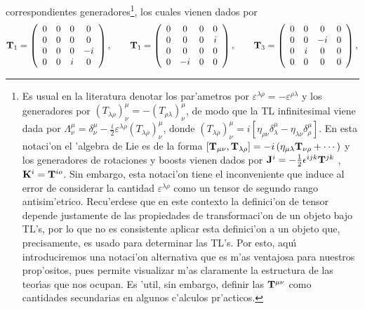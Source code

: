 correspondientes generadores\footnote{%
Es usual en la literatura denotar los par'ametros por $\varepsilon
^{\lambda \rho }=-\varepsilon ^{\rho \lambda }$ y los generadores por $%
\left( T_{\lambda \rho }\right) _{\nu }^{\mu }=-\left( T_{\rho \lambda
}\right) _{\nu }^{\mu }$, de modo que la TL infinitesimal viene dada por $%
\Lambda _{\nu }^{\mu }=\delta _{\nu }^{\mu }-\frac{i}{2}\varepsilon
^{\lambda \rho }\left( T_{\lambda \rho }\right) _{\nu }^{\mu }$, donde $%
\left( T_{\lambda \rho }\right) _{\nu }^{\mu }=i\left[ \eta _{\rho \nu
}\delta _{\lambda }^{\mu }-\eta _{\lambda \nu }\delta _{\rho }^{\mu }\right] 
$. En esta notaci'on el 'algebra de Lie es de la forma $\left[ {\bf T}%
_{\mu \nu },{\bf T}_{\lambda \rho }\right] =-i\left( \eta _{\mu \lambda }%
{\bf T}_{\nu \rho }+\cdots \right) $ y los generadores de rotaciones y
boosts vienen dados por ${\bf J}^{i}=-\frac{1}{2}\epsilon ^{ijk}{\bf T}^{jk}$%
, ${\bf K}^{i}={\bf T}^{io}$. Sin embargo, esta notaci'on tiene el
inconveniente que induce al error de considerar la cantidad $\varepsilon
^{\lambda \rho }$ como un tensor de segundo rango antisim'etrico.
Recu'erdese que en este contexto la definici'on de tensor depende
justamente de las propiedades de transformaci'on de un objeto bajo TL's,
por lo que no es consistente aplicar esta definici'on a un objeto que,
precisamente, es usado para determinar las TL's. Por esto, aqu{\'{\i }}
introduciremos una notaci'on alternativa que es m'as ventajosa para
nuestros prop'ositos, pues permite visualizar m'as claramente la
estructura de las teor{\'{\i }}as que nos ocupan. Es 'util, sin embargo,
definir las ${\bf T}^{\mu \nu }$ como cantidades secundarias en algunos
c'alculos pr'acticos.}, los cuales
vienen dados por 
\begin{equation}
{\bf T}_{1}=\left( 
\begin{array}{cccc}
0 & 0 & 0 & 0 \\ 
0 & 0 & 0 & 0 \\ 
0 & 0 & 0 & -i \\ 
0 & 0 & i & 0
\end{array}
\right) ,\qquad {\bf T}_{1}=\left( 
\begin{array}{cccc}
0 & 0 & 0 & 0 \\ 
0 & 0 & 0 & i \\ 
0 & 0 & 0 & 0 \\ 
0 & -i & 0 & 0
\end{array}
\right) ,\qquad {\bf T}_{3}=\left( 
\begin{array}{cccc}
0 & 0 & 0 & 0 \\ 
0 & 0 & -i & 0 \\ 
0 & i & 0 & 0 \\ 
0 & 0 & 0 & 0
\end{array}
\right) ,  \label{d1}
\end{equation}
